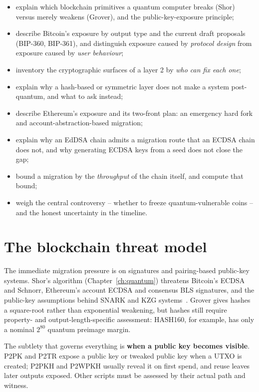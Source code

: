 \begin{itemize}
  \item explain which blockchain primitives a quantum computer breaks (Shor) versus merely weakens (Grover), and the public-key-exposure principle;
  \item describe Bitcoin's exposure by output type and the current draft proposals (BIP-360, BIP-361), and distinguish exposure caused by \emph{protocol design} from exposure caused by \emph{user behaviour};
  \item inventory the cryptographic surfaces of a layer 2 by \emph{who can fix each one};
  \item explain why a hash-based or symmetric layer does not make a system post-quantum, and what to ask instead;
  \item describe Ethereum's exposure and its two-front plan: an emergency hard fork and account-abstraction-based migration;
  \item explain why an EdDSA chain admits a migration route that an ECDSA chain does not, and why generating ECDSA keys from a seed does not close the gap;
  \item bound a migration by the \emph{throughput} of the chain itself, and compute that bound;
  \item weigh the central controversy -- whether to freeze quantum-vulnerable coins -- and the honest uncertainty in the timeline.
\end{itemize}

\section{The blockchain threat model}
The immediate migration pressure is on signatures and pairing-based public-key systems.
Shor's algorithm (Chapter~\ref{ch:quantum}) threatens Bitcoin's ECDSA and Schnorr,
Ethereum's account ECDSA and consensus BLS signatures, and the public-key assumptions
behind SNARK and KZG systems~\cite{quantumhorizon2026,ethpqroadmap}. Grover gives
hashes a square-root rather than exponential weakening, but hashes still require
property- and output-length-specific assessment: HASH160, for example, has only a
nominal $2^{80}$ quantum preimage margin.

The subtlety that governs everything is \textbf{when a public key becomes visible}.
P2PK and P2TR expose a public key or tweaked public key when a UTXO is created;
P2PKH and P2WPKH usually reveal it on first spend, and reuse leaves later outputs
exposed. Other scripts must be assessed by their actual path and witness.

